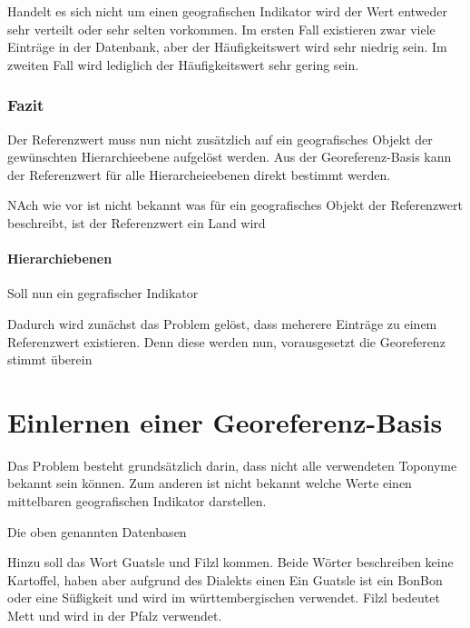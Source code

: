 			Handelt es sich nicht um einen geografischen Indikator wird der Wert entweder sehr verteilt oder sehr selten vorkommen.
			Im ersten Fall existieren zwar viele Einträge in der Datenbank, aber der Häufigkeitswert wird sehr niedrig sein.
			Im zweiten Fall wird lediglich der Häufigkeitswert sehr gering sein.




		
				
			\subsubsection{Fazit} 

				Der Referenzwert muss nun nicht zusätzlich auf ein geografisches Objekt der gewünschten Hierarchieebene aufgelöst werden.
				Aus der Georeferenz-Basis kann der Referenzwert für alle Hierarcheieebenen direkt bestimmt werden.

				NAch wie vor ist nicht bekannt was für ein geografisches Objekt der Referenzwert beschreibt, ist der Referenzwert ein Land wird 



		
			\paragraph{Hierarchiebenen}   


			Soll nun ein gegrafischer Indikator



			Dadurch wird zunächst das Problem gelöst, dass meherere Einträge zu einem Referenzwert existieren.
			Denn diese werden nun, vorausgesetzt die Georeferenz stimmt überein 






			





	\section{Einlernen einer Georeferenz-Basis}

			Das Problem besteht grundsätzlich darin, dass nicht alle verwendeten Toponyme bekannt sein können. 
			Zum anderen ist nicht bekannt welche Werte einen mittelbaren geografischen Indikator darstellen.




			Die oben genannten Datenbasen  

				Hinzu soll das Wort Guatsle und Filzl kommen.
				Beide Wörter beschreiben keine Kartoffel, haben aber aufgrund des Dialekts einen 
				Ein Guatsle ist ein BonBon oder eine Süßigkeit und wird im württembergischen verwendet.
				Filzl bedeutet Mett und wird in der Pfalz verwendet.


